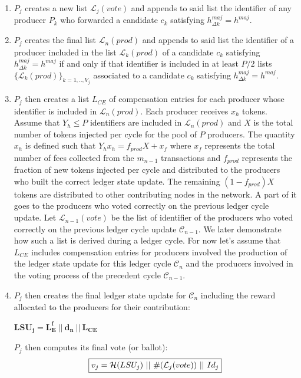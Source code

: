 \begin{enumerate}
\item $P_j$ creates a new list $\mathcal{L}_j(vote)$ and appends to said list the identifier of any producer $P_k$ who forwarded a candidate $c_k$ satisfying $h^{maj}_{\Delta k} = h^{maj}$.
\item $P_j$ creates the final list $\mathcal{L}_n(prod)$ and appends to said list  the identifier of a producer included in the list $\mathcal{L}_k(prod)$ of a candidate $c_k$ satisfying $h^{maj}_{\Delta k} = h^{maj}$ if and only if that identifier is included in at least $P/2$ lists $\{\mathcal{L}_{k}(prod)\}_{k=1,..,V_j}$ associated to a candidate $c_{k}$ satisfying $h^{maj}_{\Delta k} = h^{maj}$. 
\item $P_j$ then creates a list $L_{CE}$ of compensation entries for each producer whose identifier is included in $\mathcal{L}_n(prod)$. Each producer receives $x_h$ tokens. Assume that $Y_h \leq P$ identifiers are included in $\mathcal{L}_n(prod)$ and $X$ is the total number of tokens injected per cycle for the pool of $P$ producers. The quantity $x_h$ is defined such that $Y_hx_h = f_{prod}X + x_f$ where $x_f$ represents the total number of fees collected from the $m_{n-1}$ transactions and $f_{prod}$ represents the fraction of new tokens injected per cycle and distributed to the producers who built the correct ledger state update. The remaining $(1-f_{prod})X$ tokens are distributed to other contributing nodes in the network. A part of it goes to the producers who voted correctly on the previous ledger cycle update. Let $\mathcal{L}_{n-1}(vote)$ be the list of identifier of the producers who voted correctly on the previous ledger cycle update $\mathcal{C}_{n-1}$. We later demonstrate how such a list is derived during a ledger cycle. For now let's assume that $L_{CE}$ includes compensation entries for producers involved the production of the ledger state update for this ledger cycle $\mathcal{C}_n$ and the producers involved in the voting process of the precedent cycle $\mathcal{C}_{n-1}$. 
\item $P_j$ then creates the final ledger state update for $\mathcal{C}_n$  including the reward allocated to the producers for their contribution:
\begin{center}
$\mathbf{LSU_j = L^f_E~||~d_n~||~L_{CE}}$
\end{center}
$P_j$ then computes its final vote (or ballot):
\begin{equation}
\label{eq:vj}
\fbox{$v_j = \mathcal{H}(LSU_j)~||~\#(\mathcal{L}_j(vote))~||~Id_j$}
\end{equation}


\end{enumerate}
